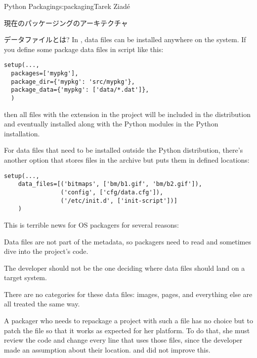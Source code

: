 \begin{aosachapter}{Python Packaging}{s:packaging}{Tarek Ziad\'{e}}
\begin{aosasect1}{現在のパッケージングのアーキテクチャ}
\begin{aosasect2}{データファイルとは?}
In , data files can be installed anywhere on the
system.  If you define some package data files in 
script like this:

\begin{verbatim}
setup(...,
  packages=['mypkg'],
  package_dir={'mypkg': 'src/mypkg'},
  package_data={'mypkg': ['data/*.dat']},
  )
\end{verbatim}

\noindent then all files with the  extension in the 
project will be included in the distribution and eventually installed
along with the Python modules in the Python installation.

For data files that need to be installed outside the Python distribution, 
there's another option that stores files in the archive but puts them in defined
locations:

\begin{verbatim}
setup(...,
    data_files=[('bitmaps', ['bm/b1.gif', 'bm/b2.gif']),
                ('config', ['cfg/data.cfg']),
                ('/etc/init.d', ['init-script'])]
    )
\end{verbatim}

\noindent
This is terrible news for OS packagers for several reasons:

\begin{aosaitemize}

  \item Data files are not part of the metadata, so packagers need to read
   and sometimes dive into the project's code.

  \item The developer should not be the one deciding where data files
  should land on a target system.

  \item There are no categories for these data files: images, 
  pages, and everything else are all treated the same way.

\end{aosaitemize}

A packager who needs to repackage a project with such a file has no
choice but to patch the  file so that it works as
expected for her platform.  To do that, she must review the code
and change every line that uses those files, since the developer made
an assumption about their location.   and 
did not improve this.

\end{aosasect2}


\end{aosasect1}
\end{aosachapter}

